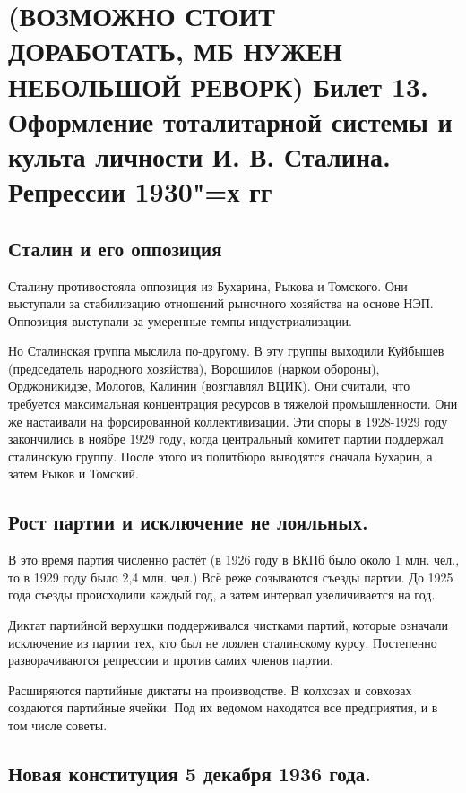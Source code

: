 \section{(ВОЗМОЖНО СТОИТ ДОРАБОТАТЬ, МБ НУЖЕН НЕБОЛЬШОЙ РЕВОРК) Билет 13. Оформление тоталитарной системы и культа личности И. В. Сталина. Репрессии 1930"=х гг}

\subsection{Сталин и его оппозиция}

Сталину противостояла оппозиция из Бухарина, Рыкова и Томского. Они выступали за стабилизацию отношений рыночного хозяйства на основе НЭП. Оппозиция выступали за умеренные темпы индустриализации.

Но Сталинская группа мыслила по-другому. В эту группы выходили Куйбышев (председатель народного хозяйства), Ворошилов (нарком обороны), Орджоникидзе, Молотов, Калинин (возглавлял ВЦИК). Они считали, что требуется максимальная концентрация ресурсов в тяжелой промышленности. Они же настаивали на форсированной коллективизации. Эти споры в 1928-1929 году закончились в ноябре 1929 году, когда центральный комитет партии поддержал сталинскую группу. После этого из политбюро выводятся сначала Бухарин, а затем Рыков и Томский.

\subsection{Рост партии и исключение не лояльных.}

В это время партия численно растёт (в 1926 году в ВКПб было около 1 млн. чел., то в 1929 году было 2,4 млн. чел.) Всё реже созываются съезды партии. До 1925 года съезды происходили каждый год, а затем интервал увеличивается на год. 

Диктат партийной верхушки поддерживался чистками партий, которые означали исключение из партии тех, кто был не лоялен сталинскому курсу. Постепенно разворачиваются репрессии и против самих членов партии.

Расширяются партийные диктаты на производстве. В колхозах и совхозах создаются партийные ячейки. Под их ведомом находятся все предприятия, и в том числе советы.

\subsection{Новая конституция 5 декабря 1936 года.}

